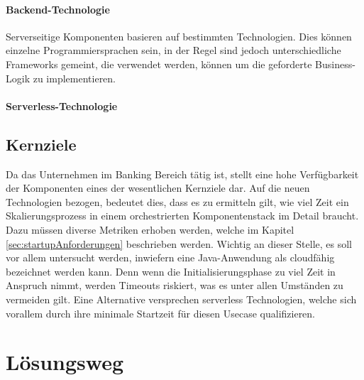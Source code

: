 \paragraph{Backend-Technologie}
Serverseitige Komponenten basieren auf bestimmten Technologien. Dies können einzelne Programmiersprachen sein, in der Regel sind jedoch unterschiedliche Frameworks gemeint, die verwendet werden, können um die geforderte Business-Logik zu implementieren.

\paragraph{Serverless-Technologie}


\subsection{Kernziele \checkmark}
Da das Unternehmen im Banking Bereich tätig ist, stellt eine hohe Verfügbarkeit der Komponenten eines der wesentlichen Kernziele dar. Auf die neuen Technologien bezogen, bedeutet dies, dass es zu ermitteln gilt, wie viel Zeit ein Skalierungsprozess in einem orchestrierten Komponentenstack im Detail braucht. Dazu müssen diverse Metriken erhoben werden, welche im Kapitel \ref{sec:startupAnforderungen} beschrieben werden. Wichtig an dieser Stelle, es soll vor allem untersucht werden, inwiefern eine Java-Anwendung als cloudfähig bezeichnet werden kann. Denn wenn die Initialisierungsphase zu viel Zeit in Anspruch nimmt, werden Timeouts riskiert, was es unter allen Umständen zu vermeiden gilt. Eine Alternative versprechen serverless Technologien, welche sich vorallem durch ihre minimale Startzeit für diesen Usecase qualifizieren.


\section{Lösungsweg \checkmark}


